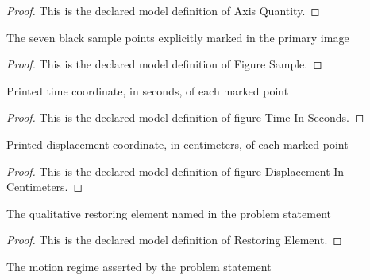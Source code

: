 \begin{proof}
  This is the declared model definition of Axis Quantity.
\end{proof}
\begin{definition}
  \label{def:physics:phyx-mini-0230:phyxminiproblems-problemphyxmini0230-figuresample}
  The seven black sample points explicitly marked in the primary image
\end{definition}
\begin{proof}
  This is the declared model definition of Figure Sample.
\end{proof}
\begin{definition}
  \label{def:physics:phyx-mini-0230:phyxminiproblems-problemphyxmini0230-figuretimeinseconds}
  Printed time coordinate, in seconds, of each marked point
\end{definition}
\begin{proof}
  This is the declared model definition of figure Time In Seconds.
\end{proof}
\begin{definition}
  \label{def:physics:phyx-mini-0230:phyxminiproblems-problemphyxmini0230-figuredisplacementincentimeters}
  Printed displacement coordinate, in centimeters, of each marked point
\end{definition}
\begin{proof}
  This is the declared model definition of figure Displacement In Centimeters.
\end{proof}
\begin{definition}
  \label{def:physics:phyx-mini-0230:phyxminiproblems-problemphyxmini0230-restoringelement}
  The qualitative restoring element named in the problem statement
\end{definition}
\begin{proof}
  This is the declared model definition of Restoring Element.
\end{proof}
\begin{definition}
  \label{def:physics:phyx-mini-0230:phyxminiproblems-problemphyxmini0230-motionregime}
  The motion regime asserted by the problem statement
\end{definition}
